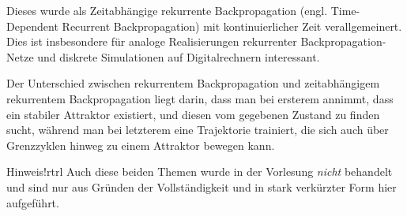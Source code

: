 Dieses wurde als Zeitabhängige rekurrente Backpropagation (engl. Time-Dependent Recurrent Backpropagation) mit kontinuierlicher Zeit verallgemeinert. Dies ist insbesondere für analoge Realisierungen rekurrenter Backpropagation-Netze und diskrete Simulationen auf Digitalrechnern interessant.

Der Unterschied zwischen rekurrentem Backpropagation und zeitabhängigem rekurrentem Backpropagation liegt darin, dass man bei ersterem annimmt, dass ein stabiler Attraktor existiert, und diesen vom gegebenen Zustand zu finden sucht, während man bei letzterem eine Trajektorie trainiert, die sich auch über Grenzzyklen hinweg zu einem Attraktor bewegen kann. 

\begin{hint}{Hinweis!}{rtrl}
	Auch diese beiden Themen wurde in der Vorlesung \emph{nicht} behandelt und sind nur aus Gründen der Vollständigkeit und in stark verkürzter Form hier aufgeführt.
\end{hint}